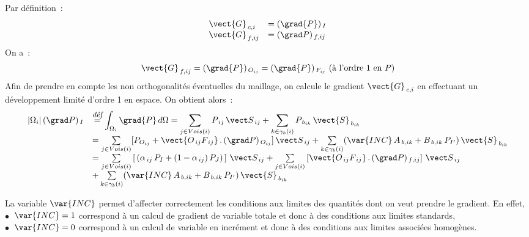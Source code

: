 Par  d\'efinition~:\\
\begin{equation}\notag
\begin{array}{ll}
\vect{G}_{\,c,i}&= (\grad {P})_{\,I} \\
\vect{G}_{\,f,ij}&= (\grad P)_{\,f,ij}\\
\end{array}
\end{equation}
On a~:
\begin{equation}\notag
\vect{G}_{\,f,ij}=(\grad {P})_{\,{O_{ij}}}= (\grad {P})_{\,{F_{ij}}}
  \text{   (\`a l'ordre 1 en $P$)}
\end{equation}
Afin de prendre en compte les non orthogonalit\'es \'eventuelles du maillage, on calcule le
gradient $\vect{G}_{\,c,i}$ en effectuant un d\'eveloppement limit\'e d'ordre
1 en espace. On obtient alors~:
\begin{equation}
\begin{array}{llll}
|\Omega_i|\,(\grad P)_{\,I}&\overset{\text{\it\small d\'ef}}{=}\displaystyle\int_{\Omega_i}{\grad{P}\, d\Omega}
=\sum\limits_{j\in Vois(i)}P_{\,ij}\,{\vect S_{\,ij}} + \sum\limits_{k\in {\gamma_b(i)}} P_{\,b_{ik}}\,\vect{S}_{\,{b}_{ik}} \\
 &= \sum\limits_{j\in Vois(i)}[P_{O_{ij}}+ \vect{O_{\,ij}F_{\,ij}}\,.\,(\grad
P)_{\,{O_{ij}}}] \,{\vect S_{\,ij}}+ \sum\limits_{k\in {\gamma_b(i)}} (\var {INC}\,A_{\,b,ik} + B_{\,b,ik}\,P_{I'} )\,\vect{S}_{\,{b}_{ik}}\\
 &= \sum\limits_{j\in Vois(i)}\left[\,(\alpha_{\,ij}\,P_I +
(1 - \alpha_{\,ij})\,P_J)\,\right]\,{\vect S_{\,ij}}
 +\sum\limits_{j\in Vois(i)}\left[\vect{O_{\,ij}F_{\,ij}}\,.\,(\grad
P)_{\,f,ij}\right]\,{\vect S_{\,ij}}\\
&+ \sum\limits_{k\in {\gamma_b(i)}} (\var{INC}\,A_{\,b,ik} + B_{\,b,ik}\,P_{I'})\,\vect{S}_{\,{b}_{ik}}\\
\end{array}
\end{equation}

La variable $\var{INC}$ permet d'affecter correctement les conditions aux limites des
quantit\'es dont on veut prendre le gradient. En effet,\\
$\bullet\ $ $\var{INC} = 1$ correspond \`a un calcul de gradient de variable totale et
donc \`a des conditions aux limites standards,\\
$\bullet\ $ $\var{INC} = 0$ correspond \`a un calcul de variable en incr\'ement et donc
\`a des conditions aux limites associ\'ees homog\`enes.\\

